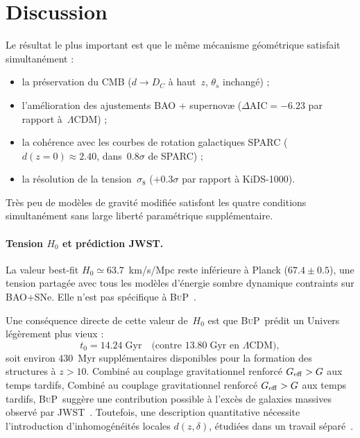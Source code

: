 \documentclass[11pt]{article}
\newcommand{\DC}{D_C}
\newcommand{\Geff}{G_{\rm eff}}
\newcommand{\sig}{\sigma_8}
\newcommand{\LCDM}{\Lambda\mathrm{CDM}}
\newcommand{\BuP}{\textsc{BuP}}
\begin{document}
\section{Discussion}

Le résultat le plus important est que le même mécanisme géométrique
satisfait simultanément :
\begin{itemize}
  \item la préservation du CMB ($d \to \DC$ à haut~$z$,
        $\theta_s$ inchangé) ;
  \item l'amélioration des ajustements BAO + supernovæ
        ($\Delta\mathrm{AIC} = -6.23$ par rapport à~$\LCDM$) ;
  \item la cohérence avec les courbes de rotation galactiques SPARC
        ($d(z=0) \approx 2.40$, dans~$0.8\sigma$ de SPARC) ;
  \item la résolution de la tension~$\sig$
        ($+0.3\sigma$ par rapport à KiDS-1000).
\end{itemize}
Très peu de modèles de gravité modifiée satisfont les quatre conditions
simultanément sans large liberté paramétrique supplémentaire.

\paragraph{Tension $H_0$ et prédiction JWST.}
La valeur best-fit $H_0 \simeq 63.7$~km/s/Mpc reste inférieure à
Planck ($67.4 \pm 0.5$), une tension partagée avec tous les modèles
d'énergie sombre dynamique contraints sur BAO+SNe.
Elle n'est pas spécifique à \BuP~\cite{tensions2025}.

Une conséquence directe de cette valeur de~$H_0$ est que \BuP\ prédit
un Univers légèrement plus vieux :
\begin{equation}
  t_0 = 14.24\;\text{Gyr}
  \quad
  \text{(contre } 13.80\;\text{Gyr en } \LCDM\text{)},
\end{equation}
soit environ $430$~Myr supplémentaires disponibles pour la formation
des structures à $z > 10$.
Combiné au couplage gravitationnel renforcé $\Geff > G$ aux temps tardifs,
Combiné au couplage gravitationnel renforcé $\Geff > G$ aux temps tardifs,
\BuP\ suggère une contribution possible à l'excès de galaxies massives
observé par JWST~\cite{jwst2023}. Toutefois, une description quantitative
nécessite l'introduction d'inhomogénéités locales $d(z,\delta)$,
étudiées dans un travail séparé~\cite{hamdad2026p4}.
\end{document}
